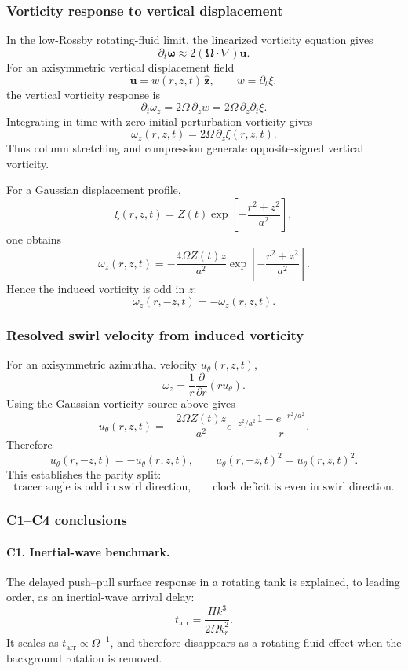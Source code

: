 \subsubsection{Vorticity response to vertical displacement}

In the low-Rossby rotating-fluid limit, the linearized vorticity equation gives
\[
\partial_t\boldsymbol\omega
\approx
2(\boldsymbol\Omega\cdot\nabla)\mathbf u.
\]
For an axisymmetric vertical displacement field
\[
\mathbf u=w(r,z,t)\,\hat{\mathbf z},
\qquad
w=\partial_t\xi,
\]
the vertical vorticity response is
\[
\partial_t\omega_z
=2\Omega\,\partial_z w
=2\Omega\,\partial_z\partial_t\xi.
\]
Integrating in time with zero initial perturbation vorticity gives
\[
\boxed{
\omega_z(r,z,t)=2\Omega\,\partial_z\xi(r,z,t).
}
\]
Thus column stretching and compression generate opposite-signed vertical
vorticity.

For a Gaussian displacement profile,
\[
\xi(r,z,t)
=Z(t)\exp\left[-\frac{r^2+z^2}{a^2}\right],
\]
one obtains
\[
\omega_z(r,z,t)
=-\frac{4\Omega Z(t)z}{a^2}
\exp\left[-\frac{r^2+z^2}{a^2}\right].
\]
Hence the induced vorticity is odd in \(z\):
\[
\boxed{
\omega_z(r,-z,t)=-\omega_z(r,z,t).
}
\]

\subsubsection{Resolved swirl velocity from induced vorticity}

For an axisymmetric azimuthal velocity \(u_\theta(r,z,t)\),
\[
\omega_z=\frac{1}{r}\frac{\partial}{\partial r}\left(r u_\theta\right).
\]
Using the Gaussian vorticity source above gives
\[
\boxed{
u_\theta(r,z,t)
=-\frac{2\Omega Z(t)z}{a^2}
e^{-z^2/a^2}
\frac{1-e^{-r^2/a^2}}{r}.
}
\]
Therefore
\[u_\theta(r,-z,t)=-u_\theta(r,z,t),
\qquad
u_\theta(r,-z,t)^2=u_\theta(r,z,t)^2.
\]
This establishes the parity split:
\[
\boxed{
\text{tracer angle is odd in swirl direction,}
\qquad
\text{clock deficit is even in swirl direction.}
}
\]

\subsubsection{C1--C4 conclusions}

\paragraph{C1. Inertial-wave benchmark.}
The delayed push--pull surface response in a rotating tank is explained, to
leading order, as an inertial-wave arrival delay:
\[
\boxed{
t_{\mathrm{arr}}=\frac{Hk^3}{2\Omega k_r^2}.
}
\]
It scales as \(t_{\mathrm{arr}}\propto\Omega^{-1}\), and therefore disappears
as a rotating-fluid effect when the background rotation is removed.

